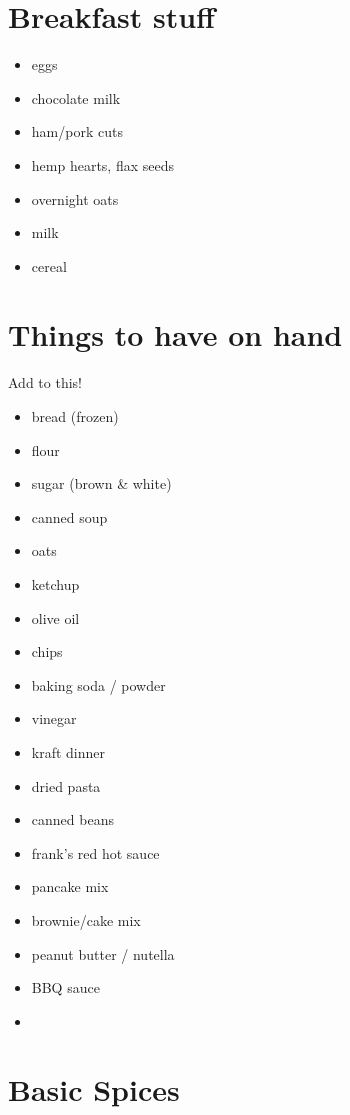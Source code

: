 \documentclass[11pt, a4paper]{article}
\begin{document}
\pagebreak
\appendix

\section{Breakfast stuff}

\begin{itemize}
\item eggs
\item chocolate milk
\item ham/pork cuts
\item hemp hearts, flax seeds
\item overnight oats
\item milk 
\item cereal 
\end{itemize}

\vspace{1pc}

\section{Things to have on hand}
Add to this!

\vspace{1pc}

\begin{itemize}
\item bread (frozen)
\item flour
\item sugar (brown \& white)
\item canned soup
\item oats
\item ketchup
\item olive oil
\item chips
\item baking soda / powder
\item vinegar
\item kraft dinner
\item dried pasta
\item canned beans
\item frank's red hot sauce
\item pancake mix
\item brownie/cake mix
\item peanut butter / nutella
\item BBQ sauce
\item 
\end{itemize}



\section{Basic Spices}
\end{document}
